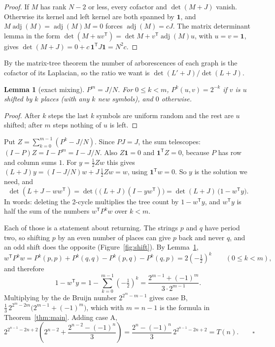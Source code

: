 \documentclass[11pt]{article}
\newtheorem{lemma}{Lemma}
\theoremstyle{remark}
\begin{document}
\begin{proof}
If $M$ has rank $N-2$ or less, every cofactor and $\det(M+J)$ vanish. Otherwise its kernel and left kernel are
both spanned by $\mathbf 1$, and $M\operatorname{adj}(M)=\operatorname{adj}(M)M=0$ forces
$\operatorname{adj}(M)=cJ$. The matrix determinant lemma in the form $\det(M+uv^{\mathsf T})=\det M+v^{\mathsf
T}\operatorname{adj}(M)u$, with $u=v=\mathbf 1$, gives $\det(M+J)=0+c\,\mathbf 1^{\mathsf T}J\mathbf 1=N^2c$.
\end{proof}

By the matrix-tree theorem the number of arborescences of each graph is the cofactor of its Laplacian, so the
ratio we want is $\det(L'+J)/\det(L+J)$.

\begin{lemma}[exact mixing]\label{lem:mix}
$P^m=J/N$. For $0\le k<m$, $P^k(u,v)=2^{-k}$ if $v$ is $u$ shifted by $k$ places (with any $k$ new symbols),
and $0$ otherwise.
\end{lemma}

\begin{proof}
After $k$ steps the last $k$ symbols are uniform random and the rest are $u$ shifted; after $m$ steps nothing
of $u$ is left.
\end{proof}

Put $Z=\sum_{k=0}^{m-1}(P^k-J/N)$. Since $PJ=J$, the sum telescopes: $(I-P)Z=I-P^m=I-J/N$. Also
$Z\mathbf 1=0$ and $\mathbf 1^{\mathsf T}Z=0$, because $P$ has row and column sums $1$. For $y=\tfrac12Zw$ this
gives $(L+J)y=(I-J/N)w+J\,\tfrac12Zw=w$, using $\mathbf 1^{\mathsf T}w=0$. So $y$ is the solution we need, and
\[
\det(L+J-ww^{\mathsf T}) = \det\bigl((L+J)(I-yw^{\mathsf T})\bigr) = \det(L+J)\,\bigl(1-w^{\mathsf T}y\bigr).
\]
In words: deleting the 2-cycle multiplies the tree count by $1-w^{\mathsf T}y$, and $w^{\mathsf T}y$ is half
the sum of the numbers $w^{\mathsf T}P^kw$ over $k<m$.

Each of those is a statement about returning. The strings $p$ and $q$ have period two, so shifting $p$ by an
even number of places can give $p$ back and never $q$, and an odd shift does the opposite
(Figure~\ref{fig:shift}). By Lemma~\ref{lem:mix},
\[
w^{\mathsf T}P^kw = P^k(p,p)+P^k(q,q)-P^k(p,q)-P^k(q,p) = 2\left(-\tfrac12\right)^k \qquad(0\le k<m),
\]
and therefore
\[
1-w^{\mathsf T}y = 1-\sum_{k=0}^{m-1}\left(-\tfrac12\right)^k = \frac{2^{m-1}+(-1)^m}{3\cdot2^{m-1}} .
\]
Multiplying by the de Bruijn number $2^{2^m-m-1}$ gives case B,
$\tfrac13\,2^{2^m-2m}\bigl(2^{m-1}+(-1)^m\bigr)$, which with $m=n-1$ is the formula in
Theorem~\ref{thm:main}. Adding case A,
\[
2^{2^{n-1}-2n+2}\left(2^{n-2}+\frac{2^{n-2}-(-1)^n}{3}\right) = \frac{2^n-(-1)^n}{3}\,2^{2^{n-1}-2n+2}=T(n). \qquad\square
\]
\end{document}

